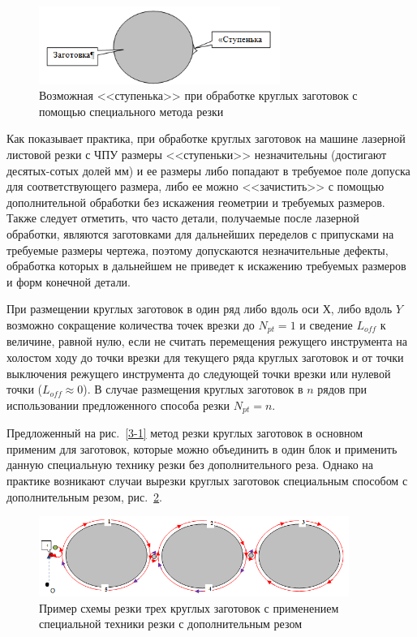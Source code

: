 \documentclass[11pt,twoside,openany]{report}
\begin{document}
\begin{figure}[h]
  \begin{center}
  \includegraphics[width=0.7\textwidth]{hiccup.png}
  \caption{Возможная <<ступенька>> при обработке круглых заготовок с помощью специального метода резки}
  \label{hiccup}
  \end{center}
\end{figure}

Как показывает практика,
при обработке круглых заготовок на
машине лазерной листовой резки с ЧПУ размеры <<ступеньки>> незначительны
(достигают десятых-сотых долей мм)
и ее размеры либо попадают в требуемое поле допуска
для соответствующего размера, либо ее можно <<зачистить>>
с помощью дополнительной обработки без искажения геометрии и требуемых размеров.
Также следует отметить, что часто детали,
получаемые после лазерной обработки,
являются заготовками для дальнейших переделов с
припусками на требуемые размеры чертежа,
поэтому допускаются незначительные дефекты,
обработка которых в дальнейшем не приведет к
искажению требуемых размеров и форм конечной детали.

При размещении круглых заготовок в один ряд
либо вдоль оси $Х$,
либо вдоль $Y$
возможно сокращение количества точек врезки до
$N_{pt}=1$
и сведение
$L_{off}$
к величине, равной нулю, если не считать перемещения
режущего инструмента на холостом ходу до точки врезки
для текущего ряда круглых заготовок и от точки выключения
режущего инструмента до следующей точки врезки или нулевой точки
($L_{off} \approx 0$).
В случае размещения круглых заготовок в $n$
рядов при использовании предложенного способа резки
$N_{pt}=n$.

Предложенный на рис.~\ref{3-1}
метод резки круглых заготовок в основном применим для заготовок,
которые можно объединить в один блок и применить
данную специальную технику резки без дополнительного реза.
Однако на практике возникают случаи вырезки круглых заготовок
специальным способом с дополнительным резом,
рис.~\ref{3-extra}.

\begin{figure}[h]
  \begin{center}
  \includegraphics[width=0.9\textwidth]{3-extra.png}
  \caption{Пример схемы резки трех круглых заготовок с применением специальной техники резки с дополнительным резом}
  \label{3-extra}
  \end{center}
\end{figure}
\end{document}
